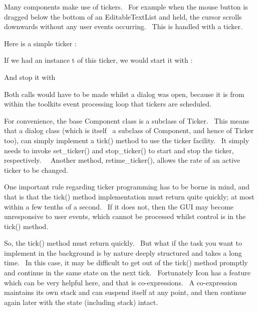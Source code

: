 Many components make use of tickers. \ For example when the mouse button
is dragged below the bottom of an \textsf{EditableTextList} and held,
the cursor scrolls downwards without any user events occurring. \ This
is handled with a ticker.

Here is a simple ticker :


If we had an instance \textsf{t} of this ticker, we would start it with
:


And stop it with


Both calls would have to be made whilst a dialog was open, because it is
from within the toolkit{\textquotesingle}s event processing loop that
tickers are scheduled.

For convenience, the base \textsf{Component} class is a subclass of
\textsf{Ticker}. \ This means that a dialog class (which is itself \ a
subclass of \textsf{Component}, and hence of \textsf{Ticker} too), can
simply implement a \textsf{tick()} method to use the ticker facility.
\ It simply needs to invoke \textsf{set\_ticker()} and
\textsf{stop\_ticker()} to start and stop the ticker, respectively.
\ \ Another method, \textsf{retime\_ticker()}, allows the rate of an
active ticker to be changed.

One important rule regarding ticker programming has to be borne in mind,
and that is that the \textsf{tick()} method implementation must return
quite quickly; at most within a few tenths of a second. \ If it does
not, then the GUI may become unresponsive to user events, which cannot
be processed whilst control is in the \textsf{tick()} method.

So, the \textsf{tick()} method must return quickly. \ But what if the
task you want to implement in the background is by nature deeply
structured and takes a long time. \ In this case, it may be difficult
to get out of the \textsf{tick()} method promptly and continue in the
same state on the next tick. \ Fortunately Icon has a feature which can
be very helpful here, and that is co-expressions. \ A co-expression
maintains its own stack and can suspend itself at any point, and then
continue again later with the state (including stack) intact.


